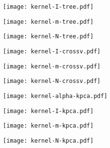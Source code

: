 \begin{figure}
  \centering
  \texttt{[image: kernel-I-tree.pdf]}
  \label{fig:Itrees}
\end{figure}

\begin{figure}
  \centering
  \texttt{[image: kernel-m-tree.pdf]}
  \label{fig:mtrees}
\end{figure}

\begin{figure}
  \centering
  \texttt{[image: kernel-N-tree.pdf]}
  \label{fig:Ntrees}
\end{figure}

\begin{figure}
  \centering
  \texttt{[image: kernel-I-crossv.pdf]}
  \label{fig:Icrossv}
\end{figure}

\begin{figure}
  \centering
  \texttt{[image: kernel-m-crossv.pdf]}
  \label{fig:mcrossv}
\end{figure}

\begin{figure}
  \centering
  \texttt{[image: kernel-N-crossv.pdf]}
  \label{fig:Ncrossv}
\end{figure}

\begin{figure}
  \centering
  \texttt{[image: kernel-alpha-kpca.pdf]}
  \label{fig:alphakpca}
\end{figure}

\begin{figure}
  \centering
  \texttt{[image: kernel-I-kpca.pdf]}
  \label{fig:Ikpca}
\end{figure}

\begin{figure}
  \centering
  \texttt{[image: kernel-m-kpca.pdf]}
  \label{fig:mkpca}
\end{figure}

\begin{figure}
  \centering
  \texttt{[image: kernel-N-kpca.pdf]}
  \label{fig:Nkpca}
\end{figure}
